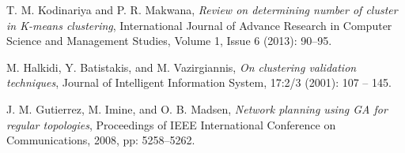 \documentclass[conference]{IEEEtran}
\begin{document}
\begin{thebibliography}{1}
T. M. Kodinariya and P. R. Makwana, \emph{Review on determining number of cluster in K-means clustering}, International Journal of Advance Research in
Computer Science and Management Studies, Volume 1, Issue 6 (2013): 90--95.

M. Halkidi, Y. Batistakis, and M. Vazirgiannis, \emph{On clustering validation techniques}, Journal of Intelligent Information System, 17:2/3 (2001): 107 -- 145.

J. M. Gutierrez, M. Imine, and O. B. Madsen, \emph{Network planning using GA for regular topologies}, Proceedings of IEEE International Conference on Communications, 2008, pp: 5258--5262.


\end{thebibliography}




\end{document}
